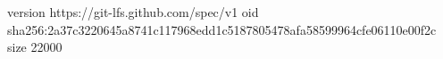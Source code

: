 version https://git-lfs.github.com/spec/v1
oid sha256:2a37c3220645a8741c117968edd1c5187805478afa58599964cfe06110e00f2c
size 22000
